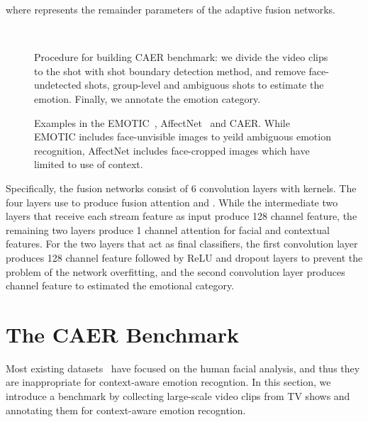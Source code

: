 \documentclass[10pt,twocolumn,letterpaper]{article}
\begin{document}
where  represents the remainder parameters of the adaptive fusion networks.
\begin{figure}
	\centering
	\renewcommand{\thesubfigure}{}
	\\
	\vspace{-10pt}
	\caption{Procedure for building CAER benchmark: we divide the video clips to the shot with shot boundary detection method, and remove face-undetected shots, group-level and ambiguous shots to estimate the emotion. Finally, we annotate the emotion category.}\label{fig:5}\vspace{-10pt}
\end{figure}

\begin{figure*}
	\centering
	\renewcommand{\thesubfigure}{}
	\vspace{-5pt}
	\caption{Examples in the EMOTIC~\cite{kosti2017emotion}, AffectNet~\cite{mollahosseiniaffectnet} and CAER. While EMOTIC includes face-unvisible images to yeild ambiguous emotion recognition, AffectNet includes face-cropped images which have limited to use of context.}
	\label{fig:6}\vspace{-5pt}
\end{figure*}

Specifically, the fusion networks consist of 6 convolution layers with  kernels.
The four layers use to produce fusion attention  and .
While the intermediate two layers that receive each stream feature as input produce 128 channel feature, the remaining two layers produce 1 channel attention for facial and contextual features.
For the two layers that act as final classifiers, the first convolution layer produces 128 channel feature followed by ReLU and dropout layers to prevent the problem of the network overfitting, and the second convolution layer produces  channel feature to estimated the emotional category.

\section{The CAER Benchmark}\label{sec:4}
Most existing datasets~\cite{goodfellow2013challenges, mollahosseiniaffectnet} have focused on the human facial analysis, and thus they are inappropriate for context-aware emotion recogntion.
In this section, we introduce a benchmark by collecting large-scale video clips from TV shows and annotating them for context-aware emotion recogntion.
\end{document}
